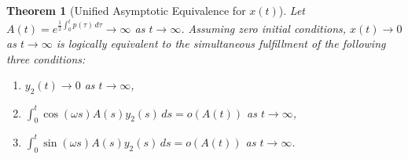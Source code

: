 \documentclass[10pt,reqno]{amsart}
\newtheorem{theorem}{Theorem}
\theoremstyle{definition}
\begin{document}
	\begin{theorem}[Unified Asymptotic Equivalence for $x(t)$] \label{thm:unified_x_only}
		Let $A(t) = e^{\frac{1}{2} \int_0^t p(\tau) \, d\tau} \to \infty$ as $t \to \infty$. Assuming zero initial conditions, $x(t) \to 0$ as $t \to \infty$ is logically equivalent to the simultaneous fulfillment of the following three conditions:
		\begin{enumerate}
			\item $y_2(t) \to 0$ as $t \to \infty$,
			\item $\int_0^t \cos(\omega s) A(s) y_2(s) \, ds = o(A(t))$ as $t \to \infty$,
			\item $\int_0^t \sin(\omega s) A(s) y_2(s) \, ds = o(A(t))$ as $t \to \infty$.
		\end{enumerate}
	\end{theorem}
	
\end{document}
